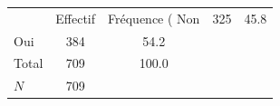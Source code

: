 {
\def\sym#1{\ifmmode^{#1}\else\(^{#1}\)\fi}
\begin{tabular}{l*{1}{cc}}
\toprule
            &    Effectif&Fréquence (%
\midrule
Non         &         325&        45.8\\
Oui         &         384&        54.2\\
Total       &         709&       100.0\\
\midrule
\(N\)       &         709&            \\
\bottomrule
\end{tabular}
}
